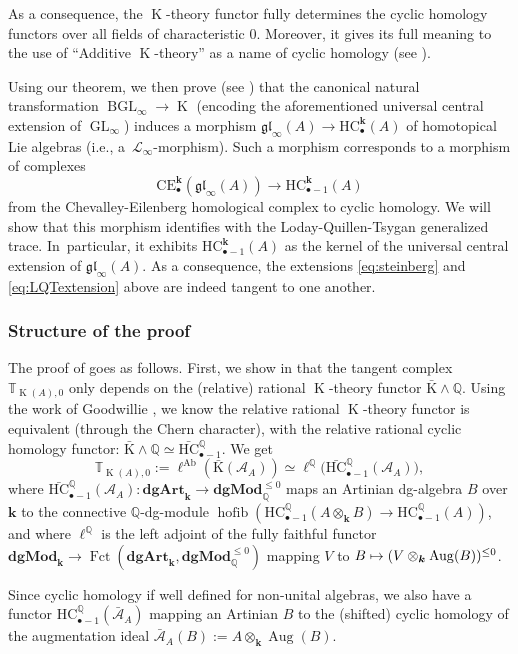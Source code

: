 \documentclass[11pt]{article}
\newcommand{\ie}{i.e.,\xspace}
\let\mathcal\mathscr
\let\autoref\Cref
\newcommand\mto{\mathchoice{\longmapsto}{\mapsto}{\mapsto}{\mapsto}}
\let\widebar\bar
\newcommand{\sbullet}{{\scriptscriptstyle\bullet}}
\theoremstyle{definition}
\newcommand{\Q}{\mathbb{Q}}
\newcommand{\T}{\mathbb{T}}
\newcommand{\dgArt}{\mathbf{dgArt}}
\newcommand{\dgMod}{\mathbf{dgMod}}
\DeclareMathOperator{\Fct}{Fct}
\DeclareMathOperator{\BGL}{BGL}
\DeclareMathOperator{\K}{K}
\newcommand{\gl}{\mathfrak{gl}}
\newcommand{\GL}{\operatorname{GL}}
\newcommand{\bK}{\widebar{\mathrm{K}}}
\newcommand{\HC}{\mathrm{HC}}
\newcommand{\Aug}{\operatorname{Aug}}
\newcommand{\bHC}{\widebar{\mathrm{HC}}{}}
\renewcommand{\k}{{\boldsymbol{k}}}
\newcommand{\ellAb}{\operatorname{\ell^{Ab}}}
\newcommand{\ellQ}{\operatorname{\ell^\Q}}
\newcommand{\Ac}{\mathcal{A}}
\newcommand{\bAc}{\widebar{\mathcal{A}}}
\newcommand{\CE}{\mathrm{CE}}
\newcommand{\hofib}{\operatorname{hofib}}
\begin{document}
As a consequence, the $\K$-theory functor fully determines the cyclic homology functors over all fields of characteristic $0$.
Moreover, it gives its full meaning to the use of ``Additive $\K$-theory'' as a name of cyclic homology (see \cite{feigintsygan:addK}).

Using our theorem, we then prove (see \autoref{thm:compLQT}) that the canonical natural transformation $\BGL_\infty \to \K$ (encoding the aforementioned universal central extension of $\GL_\infty$) induces a morphism $\gl_\infty(A) \to \HC_\sbullet^\k(A)$ of homotopical Lie algebras (\ie a~$\mathcal L_\infty$-morphism). Such a morphism corresponds to a morphism of complexes
\[
\CE_\sbullet^{\k}(\gl_\infty(A)) \to \HC_{\sbullet-1}^\k(A)
\]
from the Chevalley-Eilenberg homological complex to cyclic homology. We will show that this morphism identifies with the Loday-Quillen-Tsygan generalized trace. In~particular, it exhibits $\HC_{\sbullet - 1}^\k(A)$ as the kernel of the universal central extension of $\gl_\infty(A)$.
As a consequence, the extensions \eqref{eq:steinberg} and \eqref{eq:LQTextension} above are indeed tangent to one another.

\subsubsection*{Structure of the proof}
The proof of \autoref{thmintro} goes as follows. First, we show in \autoref{subsec:FMPQ} that the tangent complex $\T_{\K(A),0}$ only depends on the (relative) rational $\K$-theory functor $\bK \wedge \Q$.
Using the work of Goodwillie \cite{goodwillie:tangentk}, we know the relative rational
$\K$-theory functor is equivalent (through the Chern character), with the relative rational cyclic homology functor: $\bK \wedge \Q \simeq \bHC_{\sbullet-1}^\Q$.
We get
\[
\T_{\K(A),0} := \ellAb(\bK(\Ac_A)) \simeq \ellQ\bigl(\bHC_{\sbullet -1}^\Q(\Ac_A)\bigr),
\]
where $\bHC^\Q_{\sbullet-1}(\Ac_A) \colon \dgArt_\k \to \dgMod_\Q^{\leq 0}$ maps an Artinian dg-algebra $B$ over $\k$ to the connective $\Q$-dg-module $\hofib(\HC_{\sbullet -1}^\Q(A \otimes_\k B) \to \HC_{\sbullet -1}^\Q(A))$, and where $\ellQ$ is the left adjoint of the fully faithful functor $\dgMod_\k \to \Fct(\dgArt_\k,\dgMod_\Q^{\leq 0})$ mapping $V$ to $B \mto (V \otimes_\k \Aug(B)) ^{\leq 0}$.

Since cyclic homology if well defined for non-unital algebras, we also have a functor $\HC_{\sbullet-1}^\Q(\bAc_A)$ mapping an Artinian $B$ to the (shifted) cyclic homology of the augmentation ideal $\bAc_A(B) := A \otimes_\k \Aug(B)$.
\end{document}
